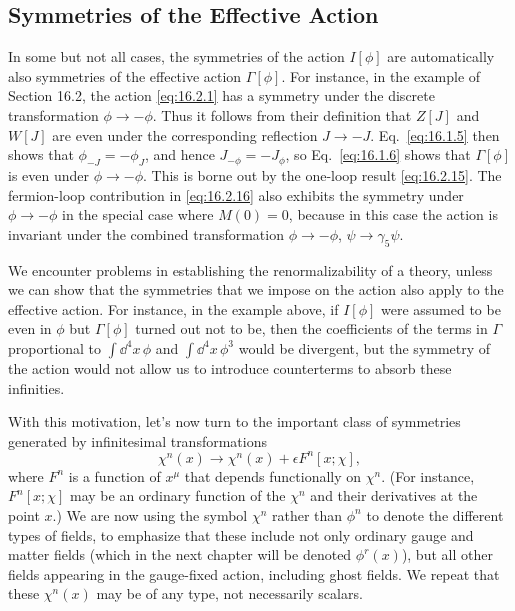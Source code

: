 \subsection{Symmetries of the Effective Action}

In some but not all cases, the symmetries of the action $I[\phi]$ are automatically also symmetries of the effective action $\Gamma[\phi]$. For instance, in the example of Section 16.2, the action \eqref{eq:16.2.1} has a symmetry under the discrete transformation $\phi\to-\phi$. Thus it follows from their definition that $Z[J]$ and $W[J]$ are even under the corresponding reflection $J\to-J$. Eq.~\eqref{eq:16.1.5} then shows that $\phi_{-J}=-\phi_J$, and hence $J_{-\phi}=-J_\phi$, so Eq.~\eqref{eq:16.1.6} shows that $\Gamma[\phi]$ is even under $\phi\to-\phi$. This is borne out by the one-loop result \eqref{eq:16.2.15}. The fermion-loop contribution in \eqref{eq:16.2.16} also exhibits the symmetry under $\phi\to-\phi$ in the special case where $M(0)=0$, because in this case the action is invariant under the combined transformation $\phi\to-\phi$, $\psi\to\gamma_5\psi$.

We encounter problems in establishing the renormalizability of a theory, unless we can show that the symmetries that we impose on the action also apply to the effective action. For instance, in the example above, if $I[\phi]$ were assumed to be even in $\phi$ but $\Gamma[\phi]$ turned out not to be, then the coefficients of the terms in $\Gamma$ proportional to $\int \dd^4x\,\phi$ and $\int \dd^4x\,\phi^3$ would be divergent, but the symmetry of the action would not allow us to introduce counterterms to absorb these infinities.

With this motivation, let's now turn to the important class of symmetries generated by infinitesimal transformations
\begin{equation}
\chi^n(x)\longrightarrow\chi^n(x)+\epsilon F^n[x;\chi],
\tag{16.4.1}\label{eq:16.4.1}
\end{equation}
where $F^n$ is a function of $x^\mu$ that depends functionally on $\chi^n$. (For instance, $F^n[x;\chi]$ may be an ordinary function of the $\chi^n$ and their derivatives at the point $x$.) We are now using the symbol $\chi^n$ rather than $\phi^n$ to denote the different types of fields, to emphasize that these include not only ordinary gauge and matter fields (which in the next chapter will be denoted $\phi^r(x)$), but all other fields appearing in the gauge-fixed action, including ghost fields. We repeat that these $\chi^n(x)$ may be of any type, not necessarily scalars.

